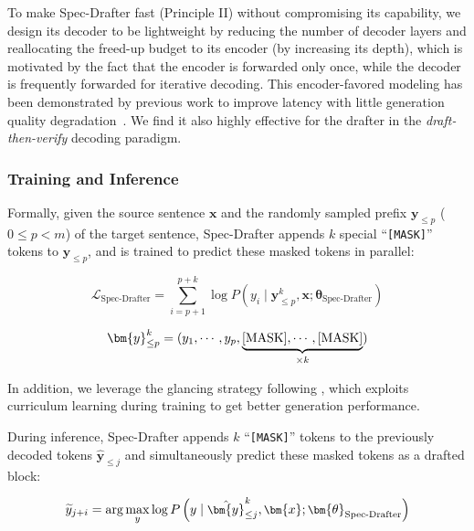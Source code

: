 To make Spec-Drafter fast (Principle II) without compromising its capability, we design its decoder to be lightweight by reducing the number of decoder layers and reallocating the freed-up budget to its encoder (by increasing its depth), which is motivated by the fact that the encoder is forwarded only once, while the decoder is frequently forwarded for iterative decoding. This encoder-favored modeling has been demonstrated by previous work to improve latency with little generation quality degradation~\cite{Kasai:2021desd, Sun:2020SAD, Ge:2022}. We find it also highly effective for the drafter in the \textit{draft-then-verify} decoding paradigm.

\subsubsection{Training and Inference} Formally, given the source sentence $\bm{x}$ and the randomly sampled prefix $\bm{y}_{\le p}$ ($0 \le p < m$)  of the target sentence, Spec-Drafter appends $k$ special ``\texttt{[MASK]}'' tokens to $\bm{y}_{\le p}$, and is trained to predict these masked tokens in parallel:

\begin{small}
\begin{equation}\label{eq:nat-drafter}
\mathcal{L}_{\textrm{Spec-Drafter}}=\sum_{i=p+1}^{p+k} \log P\left(y_{i} \mid \bm{y}_{\le p}^k, \bm{x}; \bm{\theta}_{\textrm{Spec-Drafter}}\right)
\end{equation}
\end{small}

\begin{small}
\begin{equation}
\bm{y}_{\le p}^k=(y_1,\cdots,y_p, \underbrace{[\rm{MASK}], \cdots, [\rm{MASK}]}_{\times k})
\end{equation}
\end{small}

In addition, we leverage the glancing strategy following \citet{Qian:2020}, which exploits curriculum learning during training to get better generation performance. 

During inference, Spec-Drafter appends $k$ ``\texttt{[MASK]}'' tokens to the previously decoded tokens $\hat{\bm{y}}_{\le j}$ and simultaneously predict these masked tokens as a drafted block:

\begin{equation}\label{eq:na-draft-infer}\small
\widetilde{y}_{j+i} = \arg \max _{y} \log P\left(y\mid \hat{\bm{y}}_{\le j}^k, \bm{x};\bm{\theta}_{\textrm{Spec-Drafter}}\right)
\end{equation}

